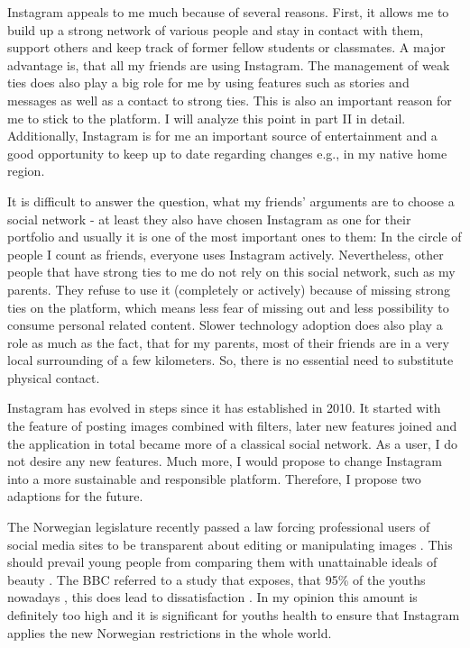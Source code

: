 \documentclass[11pt,letterpaper]{article}
\begin{document}
Instagram appeals to me much because of several reasons. First, it allows me to build up a strong network of various people and stay in contact with them, support others and keep track of former fellow students or classmates. A major advantage is, that all my friends are using Instagram. The management of weak ties does also play a big role for me by using features such as stories and messages as well as a contact to strong ties. This is also an important reason for me to stick to the platform. I will analyze this point in part II in detail. Additionally, Instagram is for me an important source of entertainment and a good opportunity to keep up to date regarding changes e.g., in my native home region.

It is difficult to answer the question, what my friends' arguments are to choose a social network - at least they also have chosen Instagram as one for their portfolio and usually it is one of the most important ones to them: In the circle of people I count as friends, everyone uses Instagram actively. Nevertheless, other people that have strong ties to me do not rely on this social network, such as my parents. They refuse to use it (completely or actively) because of missing strong ties on the platform, which means less fear of missing out and less possibility to consume personal related content. Slower technology adoption does also play a role as much as the fact, that for my parents, most of their friends are in a very local surrounding of a few kilometers. So, there is no essential need to substitute physical contact.

Instagram has evolved in steps since it has established in 2010. It started with the feature of posting images combined with filters, later new features joined and the application in total became more of a classical social network. As a user, I do not desire any new features. Much more, I would propose to change Instagram into a more sustainable and responsible platform. Therefore, I propose two adaptions for the future.

The Norwegian legislature recently passed a law forcing professional users of social media sites to be transparent about editing or manipulating images \autocite[][]{PressReynolds.2021}. This should prevail young people from comparing them with unattainable ideals of beauty \autocite[][]{PressReynolds.2021}. The BBC referred to a study that exposes, that 95\% of the youths nowadays  \autocite[][]{Grant.2021}, this does lead to dissatisfaction \autocites[p. 501]{Babaleye.2020}[p. 1]{Rafati.2021}. In my opinion this amount is definitely too high and it is significant for youths health to ensure that Instagram applies the new Norwegian restrictions in the whole world.
\end{document}
